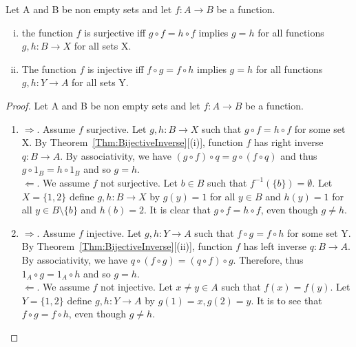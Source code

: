 \documentclass[a4paper,english,12pt]{article}   	%
\begin{document}
\begin{thm} Let A and B be non empty sets and let $f \colon A \to B$ be a function.
\begin{enumerate}[(i)]
\item the function $f$ is surjective iff $g \circ f = h \circ f$ implies $g=h$ for all functions $g,h \colon B \to X$ for all sets X.
\item The function $f$ is injective iff $f \circ g = f \circ h$ implies $g=h$ for all functions $g,h \colon Y \to A$ for all sets Y.
\end{enumerate}
\begin{proof} Let A and B be non empty sets and let $f \colon A \to B$ be a function.
\begin{enumerate}
\item $\Rightarrow$. Assume $f$ surjective. Let $g,h \colon B \to X$ such that $g \circ f = h \circ f$ for some set X. By Theorem~\ref{Thm:BijectiveInverse}[(i)], function $f$ has right inverse $q \colon B \to A$. By associativity, we have $(g \circ f) \circ q = g \circ (f \circ q)$ and thus $g \circ 1_{B} = h \circ 1_{B}$ and so $g=h$.\\
$\Leftarrow$. We assume $f$ not surjective. Let $b \in B$ such that $f^{-1}(\{b\})= \emptyset$. Let $X=\{1,2\}$ define $g,h \colon B \to X$ by $g(y)=1$ for all $y \in B$ and $h(y)=1$ for all $y \in B \setminus \{b\}$ and $h(b)=2$. It is clear that $g \circ f = h \circ f$, even though $g \neq h$.
\item $\Rightarrow$. Assume $f$ injective. Let $g,h \colon Y \to A$ such that $f \circ g = f \circ h$ for some set Y. By Theorem~\ref{Thm:BijectiveInverse}[(ii)], function $f$ has left inverse $q \colon B \to A$. By associativity, we have $ q \circ (f \circ g) = (q \circ f) \circ g$. Therefore, thus $1_{A} \circ g = 1_{A} \circ h$ and so $g=h$.\\
$\Leftarrow$. We assume $f$ not injective. Let $x \neq y \in A$ such that $f(x) = f(y)$. Let $Y = \{1,2\}$ define $g,h \colon Y \to A$ by $g(1) = x, g(2) = y$. It is to see that $f \circ g = f \circ h$, even though $g \neq h$.
\end{enumerate}
\end{proof}
\end{thm}
\end{document}
